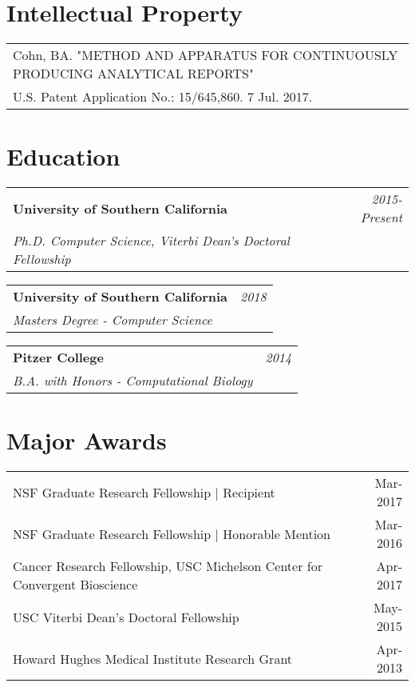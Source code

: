\documentclass[10pt,a4paper]{article}
\begin{document}
\vspace*{3mm}\section*{Intellectual Property}

  \vspace*{1mm}
  \begin{tabularx}{17cm}{X}
Cohn, BA. "METHOD AND APPARATUS FOR CONTINUOUSLY PRODUCING ANALYTICAL REPORTS"\\
 U.S. Patent Application No.: 15/645,860. 7 Jul. 2017.\\[2mm]
  \end{tabularx}


  \newpage

  \vspace*{-15mm}\section*{Education}

  \vspace*{0mm}\noindent\begin{tabularx}{17cm}{X r}
    \textbf{University of Southern California} & \textit{2015-Present} \\
    \textit{Ph.D. Computer Science, Viterbi Dean's Doctoral Fellowship}
  \end{tabularx} 

  \vspace*{1mm}\noindent\begin{tabularx}{17cm}{X r}
    \textbf{University of Southern California} & \textit{2018} \\ %
    \textit{Masters Degree - Computer Science}
  \end{tabularx} 

  \vspace*{1mm}\noindent\begin{tabularx}{17cm}{X r}
    \textbf{Pitzer College} & \textit{2014} \\
    \textit{B.A. with Honors - Computational Biology}
  \end{tabularx}

  \vspace*{2mm}\section*{Major Awards}
  \vspace*{1mm}\noindent\begin{tabularx}{17cm}{X r}
    NSF Graduate Research Fellowship | Recipient & Mar-2017 \\
    NSF Graduate Research Fellowship | Honorable Mention & Mar-2016 \\
    Cancer Research Fellowship, USC Michelson Center for Convergent Bioscience & Apr-2017 \\ %
    USC Viterbi Dean's Doctoral Fellowship & May-2015 \\
    Howard Hughes Medical Institute Research Grant & Apr-2013
  \end{tabularx}
\end{document}

